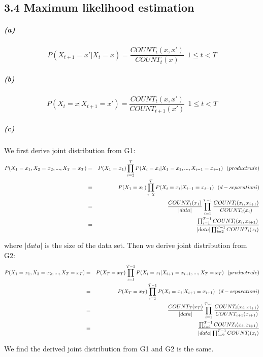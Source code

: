 \documentclass{article}
\newcommand{\RNum}[1]{\uppercase\expandafter{\romannumeral #1\relax}}
\begin{document}
\subsection*{3.4 Maximum likelihood estimation}
\subparagraph*{(a)}
\begin{equation*}
P(X_{t+1}=x'|X_t=x) = \frac{COUNT_t(x,x')}{COUNT_t(x)}~~1 \le t < T
\end{equation*}

\subparagraph*{(b)}
\begin{equation*}
P(X_{t}=x|X_{t+1}=x') = \frac{COUNT_t(x,x')}{COUNT_{t+1}(x')}~~1 \le t < T
\end{equation*}

\subparagraph*{(c)}
We first derive joint distribution from G1:
\begin{eqnarray*}
P(X_1 = x_1, X_2 = x_2, ... , X_T = x_T) &=& P(X_1 = x_1)\prod_{i=2}^{T}P(X_i = x_i|X_1 = x_1,...,X_{i-1} = x_{i-1})~~(product rule)\\
&=& P(X_1 = x_1)\prod_{i=2}^{T}P(X_i = x_i|X_{i-1} = x_{i-1})~~(d-separation \RNum{1})\\
&=& \frac{COUNT_1(x_1)}{|data|} \prod_{i=1}^{T-1}\frac{COUNT_i(x_i,x_{i+1})}{COUNT_i(x_i)}\\
&=& \frac{\prod_{i=1}^{T-1}COUNT_i(x_i,x_{i+1})}{|data|\prod_{i=2}^{T-1}COUNT_i(x_i)}
\end{eqnarray*}

where $|data|$ is the size of the data set. Then we derive joint distribution from G2:
\begin{eqnarray*}
	P(X_1 = x_1, X_2 = x_2, ... , X_T = x_T) &=& P(X_T = x_T)\prod_{i=1}^{T-1}P(X_i = x_i|X_{i+1} = x_{i+1},...,X_{T} = x_{T})~~(product rule)\\
	&=& P(X_T = x_T)\prod_{i=1}^{T-1}P(X_i = x_i|X_{i+1} = x_{i+1})~~(d-separation \RNum{1})\\
	&=& \frac{COUNT_T(x_T)}{|data|} \prod_{i=1}^{T-1}\frac{COUNT_i(x_i,x_{i+1})}{COUNT_{i+1}(x_{i+1})}\\
	&=& \frac{\prod_{i=1}^{T-1}COUNT_i(x_i,x_{i+1})}{|data|\prod_{i=2}^{T-1}COUNT_i(x_i)}
\end{eqnarray*}

We find the derived joint distribution from G1 and G2 is the same.
\end{document}
